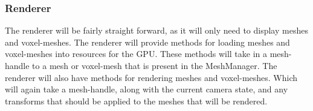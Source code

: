 \subsubsection{Renderer}

The renderer will be fairly straight forward, as it will only need to display meshes and 
voxel-meshes. The renderer will provide methods for loading meshes and voxel-meshes into resources 
for the GPU. These methods will take in a mesh-handle to a mesh or voxel-mesh that is present in the
MeshManager. The renderer will also have methods for rendering meshes and voxel-meshes. Which will 
again take a mesh-handle, along with the current camera state, and any transforms that should be 
applied to the meshes that will be rendered.






